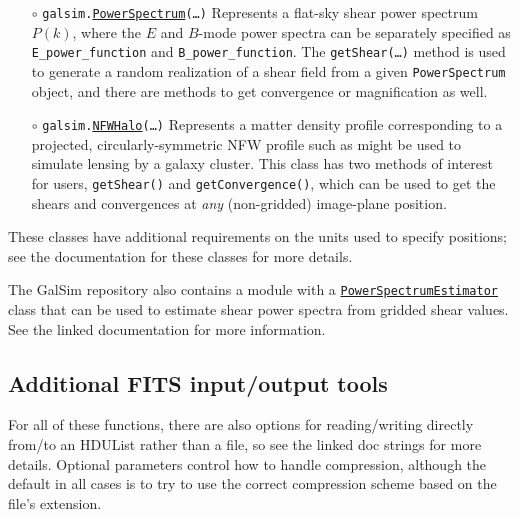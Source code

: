 \documentclass[preprint,10pt]{../../devel/modules/aastex}
\begin{document}
\begin{itemize}
  \item[$\circ$]
  \texttt{galsim.}\href{http://galsim-developers.github.io/GalSim/classgalsim_1_1lensing__ps_1_1_power_spectrum.html}{\texttt{PowerSpectrum}}\texttt{(\dots)}
    \newline 
    Represents a flat-sky shear power spectrum $P(k)$, where the $E$ and
    $B$-mode power spectra can be separately specified as
    \texttt{E\_power\_function} and \texttt{B\_power\_function}.  The
    \texttt{getShear(\dots)} method is used to generate a random realization of
    a shear field from a given \texttt{PowerSpectrum} object,
    and there are methods to get convergence or magnification as well.

  \item[$\circ$]
  \texttt{galsim.}\href{http://galsim-developers.github.io/GalSim/classgalsim_1_1nfw__halo_1_1_n_f_w_halo.html}{\texttt{NFWHalo}}\texttt{(\dots)}
    \newline 
    Represents a matter density profile corresponding to a projected,
    circularly-symmetric NFW profile such as might be used to simulate lensing
    by a galaxy cluster.  This class has two methods of interest for users,
    \texttt{getShear()} and \texttt{getConvergence()}, which can be used to get
    the shears and convergences at {\em any} (non-gridded) image-plane
    position.
\end{itemize}

These classes have additional requirements on the units used to specify
positions; see the documentation for these classes for more details.

The GalSim repository also contains a module with a
\href{http://galsim-developers.github.io/GalSim/classgalsim_1_1pse_1_1_power_spectrum_estimator.html}{\texttt{PowerSpectrumEstimator}} class that can be used to estimate shear power
spectra from gridded shear values.  See the linked documentation for more information.

\subsection{Additional FITS input/output tools}\label{sect:multifits}

For all of these functions, there are also options for reading/writing directly from/to
an HDUList rather than a file, so see the linked doc strings for more details.
Optional parameters control how to handle compression, although the default in all cases
is to try to use the correct compression scheme based on the file's extension.
\end{document}
